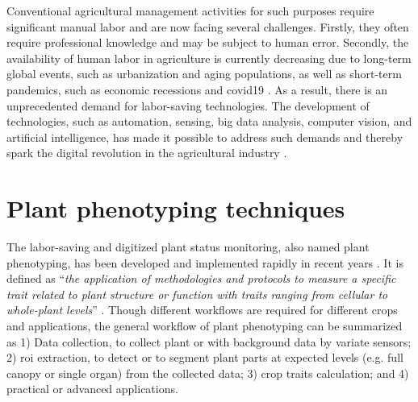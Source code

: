 
Conventional agricultural management activities for such purposes require significant manual labor and are now facing several challenges. Firstly, they often require professional knowledge and may be subject to human error. Secondly, the availability of human labor in agriculture is currently decreasing due to long-term global events, such as urbanization and aging populations, as well as short-term pandemics, such as economic recessions and \gls{covid19} \citep{gallardo_adoption_2018, larue_labor_2020}. As a result, there is an unprecedented demand for labor-saving technologies. The development of technologies, such as automation, sensing, big data analysis, computer vision, and artificial intelligence, has made it possible to address such demands and thereby spark the digital revolution in the agricultural industry \citep{gallardo_adoption_2018}.

\section{Plant phenotyping techniques}
The labor-saving and digitized plant status monitoring, also named plant phenotyping, has been developed and implemented rapidly in recent years \citep{araus_field_2014}. It is defined as ``\textit{the application of methodologies and protocols to measure a specific trait related to plant structure or function with traits ranging from cellular to whole-plant levels}'' \citep{fiorani_future_2013, ghanem_physiological_2015}. Though different workflows are required for different crops and applications, the general workflow of plant phenotyping can be summarized as 1) Data collection, to collect plant or with background data by variate sensors; 2) \gls{roi} extraction, to detect or to segment plant parts at expected levels (e.g. full canopy or single organ) from the collected data; 3) crop traits calculation; and 4) practical or advanced applications.

